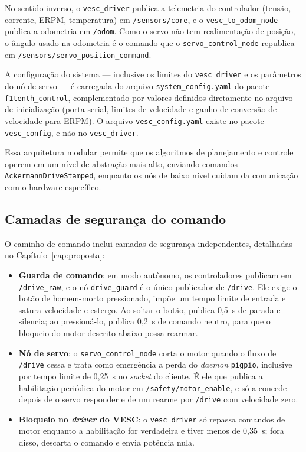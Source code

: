 No sentido inverso, o \texttt{vesc\_driver} publica a telemetria do controlador
(tensão, corrente, ERPM, temperatura) em \texttt{/sensors/core}, e o
\texttt{vesc\_to\_odom\_node} publica a odometria em \texttt{/odom}. Como o servo
não tem realimentação de posição, o ângulo usado na odometria é o comando que o
\texttt{servo\_control\_node} republica em
\texttt{/sensors/servo\_position\_command}.

A configuração do sistema --- inclusive os limites do \texttt{vesc\_driver} e os
parâmetros do nó de servo --- é carregada do arquivo \texttt{system\_config.yaml}
do pacote \texttt{f1tenth\_control}, complementado por valores definidos
diretamente no arquivo de inicialização (porta serial, limites de velocidade e
ganho de conversão de velocidade para ERPM). O arquivo \texttt{vesc\_config.yaml}
existe no pacote \texttt{vesc\_config}, e não no \texttt{vesc\_driver}.

Essa arquitetura modular permite que os algoritmos de planejamento e controle
operem em um nível de abstração mais alto, enviando comandos
\texttt{AckermannDriveStamped}, enquanto os nós de baixo nível cuidam da
comunicação com o hardware específico.

\subsection{Camadas de segurança do comando}

O caminho de comando inclui camadas de segurança independentes, detalhadas no
Capítulo~\ref{cap:proposta}:
\begin{itemize}
      \item \textbf{Guarda de comando}: em modo autônomo, os controladores
            publicam em \texttt{/drive\_raw}, e o nó \texttt{drive\_guard} é o
            único publicador de \texttt{/drive}. Ele exige o botão de
            homem-morto pressionado, impõe um tempo limite de entrada e satura
            velocidade e esterço. Ao soltar o botão, publica 0,5~s de parada e
            silencia; ao pressioná-lo, publica 0,2~s de comando neutro, para
            que o bloqueio do motor descrito abaixo possa rearmar.
      \item \textbf{Nó de servo}: o \texttt{servo\_control\_node} corta o motor
            quando o fluxo de \texttt{/drive} cessa e trata como emergência a
            perda do \textit{daemon} \texttt{pigpio}, inclusive por tempo limite
            de 0,25~s no \textit{socket} do cliente. É ele que publica a
            habilitação periódica do motor em \texttt{/safety/motor\_enable},
            e só a concede depois de o servo responder e de um rearme por
            \texttt{/drive} com velocidade zero.
      \item \textbf{Bloqueio no \textit{driver} do VESC}: o
            \texttt{vesc\_driver} só repassa comandos de motor enquanto a
            habilitação for verdadeira e tiver menos de 0,35~s; fora disso,
            descarta o comando e envia potência nula.
\end{itemize}

